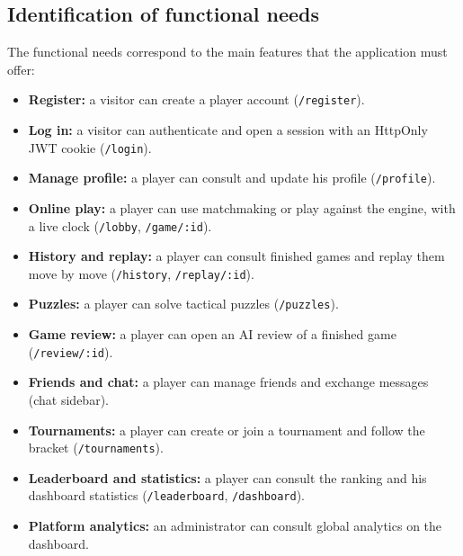 \documentclass[12pt,a4paper,oneside]{report}
\begin{document}
\subsection{Identification of functional needs}
The functional needs correspond to the main features that the application must offer:
\begin{itemize}[leftmargin=1.4em,itemsep=0.4em]
  \item \textbf{Register:} a visitor can create a player account (\texttt{/register}).
  \item \textbf{Log in:} a visitor can authenticate and open a session with an HttpOnly JWT cookie (\texttt{/login}).
  \item \textbf{Manage profile:} a player can consult and update his profile (\texttt{/profile}).
  \item \textbf{Online play:} a player can use matchmaking or play against the engine, with a live clock (\texttt{/lobby}, \texttt{/game/:id}).
  \item \textbf{History and replay:} a player can consult finished games and replay them move by move (\texttt{/history}, \texttt{/replay/:id}).
  \item \textbf{Puzzles:} a player can solve tactical puzzles (\texttt{/puzzles}).
  \item \textbf{Game review:} a player can open an AI review of a finished game (\texttt{/review/:id}).
  \item \textbf{Friends and chat:} a player can manage friends and exchange messages (chat sidebar).
  \item \textbf{Tournaments:} a player can create or join a tournament and follow the bracket (\texttt{/tournaments}).
  \item \textbf{Leaderboard and statistics:} a player can consult the ranking and his dashboard statistics (\texttt{/leaderboard}, \texttt{/dashboard}).
  \item \textbf{Platform analytics:} an administrator can consult global analytics on the dashboard.
\end{itemize}
\end{document}
